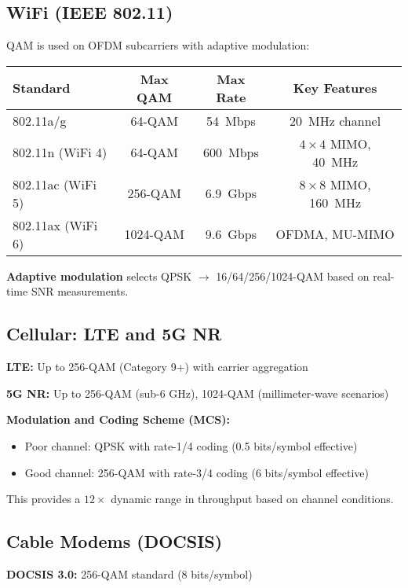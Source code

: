 \subsection{WiFi (IEEE 802.11)}

QAM is used on OFDM subcarriers with adaptive modulation:

\begin{center}
\begin{tabular}{@{}lccc@{}}
\toprule
Standard & Max QAM & Max Rate & Key Features \\
\midrule
802.11a/g & 64-QAM & 54~Mbps & 20~MHz channel \\
802.11n (WiFi 4) & 64-QAM & 600~Mbps & $4 \times 4$ MIMO, 40~MHz \\
802.11ac (WiFi 5) & 256-QAM & 6.9~Gbps & $8 \times 8$ MIMO, 160~MHz \\
802.11ax (WiFi 6) & 1024-QAM & 9.6~Gbps & OFDMA, MU-MIMO \\
\bottomrule
\end{tabular}
\end{center}

\textbf{Adaptive modulation} selects QPSK $\rightarrow$ 16/64/256/1024-QAM based on real-time SNR measurements.

\subsection{Cellular: LTE and 5G NR}

\textbf{LTE:} Up to 256-QAM (Category 9+) with carrier aggregation

\textbf{5G NR:} Up to 256-QAM (sub-6 GHz), 1024-QAM (millimeter-wave scenarios)

\textbf{Modulation and Coding Scheme (MCS):}
\begin{itemize}
\item Poor channel: QPSK with rate-1/4 coding (0.5 bits/symbol effective)
\item Good channel: 256-QAM with rate-3/4 coding (6 bits/symbol effective)
\end{itemize}

This provides a $12\times$ dynamic range in throughput based on channel conditions.

\subsection{Cable Modems (DOCSIS)}

\textbf{DOCSIS 3.0:} 256-QAM standard (8 bits/symbol)

